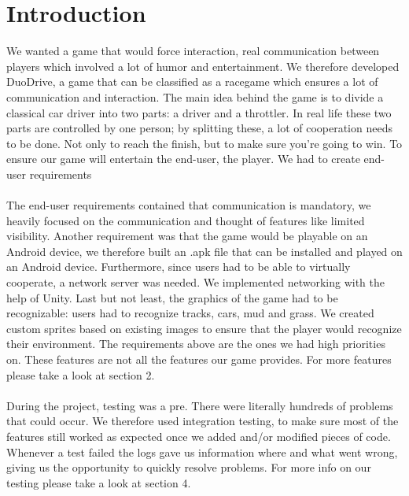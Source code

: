 \documentclass[11pt,twoside,a4paper]{article}
\begin{document}
\section{Introduction}
We wanted a game that would force interaction, real communication between players which involved a lot of humor and entertainment. We therefore developed DuoDrive, a game that can be classified as a racegame which ensures a lot of communication and interaction. The main idea behind the game is to divide a classical car driver into two parts: a driver and a throttler. In real life these two parts are controlled by one person; by splitting these, a lot of cooperation needs to be done. Not only to reach the finish, but to make sure you're going to win. To ensure our game will entertain the end-user, the player. We had to create end-user requirements\\\\
The end-user requirements contained that communication is mandatory, we heavily focused on the communication and thought of features like limited visibility. Another requirement was that the game would be playable on an Android device, we therefore built an .apk file that can be installed and played on an Android device. Furthermore, since users had to be able to virtually cooperate, a network server was needed. We implemented networking with the help of Unity. Last but not least, the graphics of the game had to be recognizable: users had to recognize tracks, cars, mud and grass. We created custom sprites based on existing images \cite{grasssprite} \cite{carsprite} to ensure that the player would recognize their environment. The requirements above are the ones we had high priorities on. These features are not all the features our game provides. For more features please take a look at section 2.\\\\
During the project, testing was a pre. There were literally hundreds of problems that could occur. We therefore used integration testing, to make sure most of the features still worked as expected once we added and/or modified pieces of code. Whenever a test failed the logs gave us information where and what went wrong, giving us the opportunity to quickly resolve problems. For more info on our testing please take a look at section 4.

\clearpage

\end{document}

